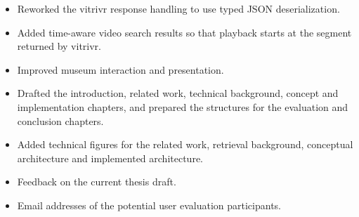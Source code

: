 \documentclass{article}
\begin{document}
\done
\begin{itemize}
    \item Reworked the vitrivr response handling to use typed JSON deserialization.
    \item Added time-aware video search results so that playback starts at the segment returned by vitrivr.
    \item Improved museum interaction and presentation.
    \item Drafted the introduction, related work, technical background, concept and implementation chapters, and prepared the structures for the evaluation and conclusion chapters.
    \item Added technical figures for the related work, retrieval background, conceptual architecture and implemented architecture.
\end{itemize}

\support
\begin{itemize}
    \item Feedback on the current thesis draft.
    \item Email addresses of the potential user evaluation participants.
\end{itemize}

\plan
{}
\end{document}
